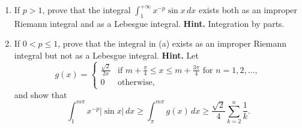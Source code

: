 \begin{problembox}
\begin{enumerate}[label=(\alph*)]
    \item If $p > 1$, prove that the integral $\int_1^{+\infty} x^{-p} \sin x \, dx$ exists both as an improper Riemann integral and as a Lebesgue integral. \textbf{Hint.} Integration by parts.
    \item If $0 < p \leq 1$, prove that the integral in (a) exists as an improper Riemann integral but not as a Lebesgue integral. \textbf{Hint.} Let
    \[g(x) = 
    \begin{cases} 
    \frac{\sqrt{2}}{2x} & \text{if } m + \frac{\pi}{4} \leq x \leq m + \frac{3\pi}{4} \text{ for } n = 1, 2, \ldots, \\ 
    0 & \text{otherwise},
    \end{cases}\]
    and show that
    \[\int_{1}^{m\pi} x^{-p} |\sin x| \, dx \geq \int_{\pi}^{m\pi} g(x) \, dx \geq \frac{\sqrt{2}}{4} \sum_{k=2}^{n} \frac{1}{k}.\]
\end{enumerate}
\end{problembox}

